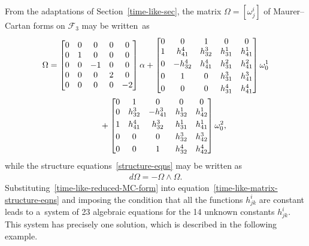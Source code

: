 \documentclass[10pt,a4paper]{amsart}
\numberwithin{equation}{section}
\theoremstyle{definition}
\begin{document}
From the adaptations of Section~\ref{time-like-sec}, the matrix $\Omega = [\omega^i_j]$ of Maurer--Cartan forms on
$\mathcal{F}_3$ may be written~as
\begin{gather}
\Omega =
\begin{bmatrix}
0 & 0 & 0 & 0 & 0
\\
0 & 1 & 0 & 0 & 0
\\
0 & 0 & -1 & 0 & 0
\\
0 & 0 & 0 & 2 & 0
\\
0 & 0 & 0 & 0 & -2
\end{bmatrix}
\alpha +
\begin{bmatrix}
0 & 0 & 1 & 0 & 0
\\
1 & h^4_{41} & h^3_{32} & h^1_{31} & h^1_{41}
\vspace{1mm}\\
0 & -h^4_{32} & h^4_{41} & h^2_{31} & h^2_{41}
\vspace{1mm}\\
0 & 1 & 0 & h^3_{31} & h^3_{41}
\vspace{1mm}\\
0 & 0 & 0 & h^4_{31} & h^4_{41}
\end{bmatrix}
\omega^1_0 \nonumber\\
\hphantom{\Omega =}{}
+
\begin{bmatrix}
0 & 1 & 0 & 0 & 0
\\
0 & h^3_{32} & -h^3_{41} & h^1_{32} & h^1_{42}
\vspace{1mm}\\
1 & h^4_{41} & h^3_{32} & h^1_{31} & h^1_{41}
\vspace{1mm}\\
0 & 0 & 0 & h^3_{32} & h^3_{42}
\vspace{1mm}\\
0 & 0 & 1 & h^4_{32} & h^4_{42}
\end{bmatrix}
\omega^2_0,
\label{time-like-reduced-MC-form}
\end{gather}
while the structure equations~\eqref{structure-eqns} may be written as
\begin{gather}
d\Omega = - \Omega \wedge \Omega.
\label{time-like-matrix-structure-eqns}
\end{gather}
Substituting~\eqref{time-like-reduced-MC-form} into equation~\eqref{time-like-matrix-structure-eqns} and imposing the
condition that all the functions $h^i_{jk}$ are constant leads to a~system of 23 algebraic equations for the 14 unknown
constants $h^i_{jk}$.
This system has precisely one solution, which is described in the following example.
\end{document}
